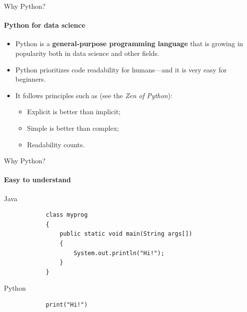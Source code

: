 \documentclass[notes,11pt, aspectratio=169, xcolor=table]{beamer}
\begin{document}
    \begin{frame}{Why Python?}
    \framesubtitle{Python for data science}
        
        \begin{itemize}
          \item Python is a \textbf{general‑purpose programming language} that is growing in popularity both in data science and other fields.
          \item Python prioritizes code readability for humans—and it is very easy for beginners.
          \item It follows principles such as (see the \textit{Zen of Python}):
             \begin{itemize}
                \item Explicit is better than implicit;
                \item Simple is better than complex;
                \item Readability counts.
            \end{itemize}
        \end{itemize}

    \end{frame}
    
    \begin{frame}[fragile=singleslide]{Why Python?}
    \framesubtitle{Easy to understand}

    \begin{block}{Java}
        \begin{verbatim}
            class myprog
            {
                public static void main(String args[])
                {
                    System.out.println("Hi!");
                }
            }
                    \end{verbatim}
    \end{block}
    
    \begin{alertblock}{Python}
        \begin{verbatim}
            print("Hi!")
        \end{verbatim}
    \end{alertblock}

    \end{frame}
\end{document}
